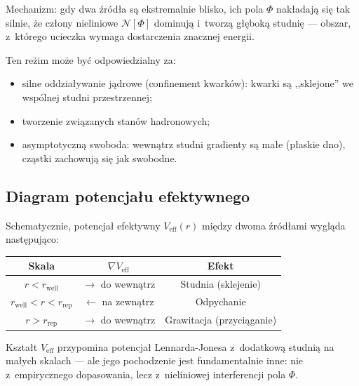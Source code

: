 Mechanizm: gdy dwa \'zr\'od\l{}a s\k{a} ekstremalnie blisko, ich pola
$\Phi$ nak\l{}adaj\k{a} si\k{e} tak silnie, \.ze cz\l{}ony nieliniowe
$\mathcal{N}[\Phi]$ dominuj\k{a} i~tworz\k{a} g\l{}\k{e}bok\k{a} studni\k{e}
--- obszar, z~kt\'orego ucieczka wymaga dostarczenia znacznej
energii.

Ten re\.zim mo\.ze by\'c odpowiedzialny za:
\begin{itemize}[nosep]
  \item silne oddzia\l{}ywanie j\k{a}drowe (confinement kwark\'ow):
        kwarki s\k{a} ,,sklejone'' we wsp\'olnej studni przestrzennej;
  \item tworzenie zwi\k{a}zanych stan\'ow hadronowych;
  \item asymptotyczn\k{a} swoboda: wewn\k{a}trz studni gradienty
        s\k{a} ma\l{}e (p\l{}askie dno), cz\k{a}stki zachowuj\k{a} si\k{e}
        jak swobodne.
\end{itemize}

\subsection{Diagram potencja\l{}u efektywnego}\label{ssec:diagram}

Schematycznie, potencja\l{} efektywny $V_{\mathrm{eff}}(r)$
mi\k{e}dzy dwoma \'zr\'od\l{}ami wygl\k{a}da nast\k{e}puj\k{a}co:

\begin{center}
\begin{tabular}{ccc}
\toprule
\textbf{Skala} & $\nabla V_{\mathrm{eff}}$ & \textbf{Efekt} \\
\midrule
$r < r_{\mathrm{well}}$ & $\to$ do wewn\k{a}trz & Studnia (sklejenie) \\
$r_{\mathrm{well}} < r < r_{\mathrm{rep}}$ & $\leftarrow$ na zewn\k{a}trz & Odpychanie \\
$r > r_{\mathrm{rep}}$ & $\to$ do wewn\k{a}trz & Grawitacja (przyci\k{a}ganie) \\
\bottomrule
\end{tabular}
\end{center}

Kszta\l{}t $V_{\mathrm{eff}}$ przypomina potencja\l{} Lennarda-Jonesa
z~dodatkow\k{a} studni\k{a} na ma\l{}ych skalach --- ale jego pochodzenie
jest fundamentalnie inne: nie z~empirycznego dopasowania, lecz
z~nieliniowej interferencji pola $\Phi$.

